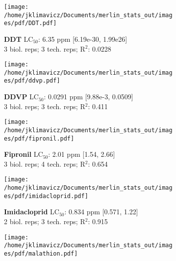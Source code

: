 \documentclass{article}
\begin{document}
\begin{figure}[thp!]
   \begin{subfigure}{0.500\textwidth}
      \centering
      \texttt{[image: /home/jklimavicz/Documents/merlin\_stats\_out/images/pdf/DDT.pdf]}
      \vspace{-0.05cm}
      \caption*{\textbf{DDT} LC$_{50}$: 6.35 ppm [6.19e-30, 1.99e26] \\ 
3 biol. reps; 3 tech. reps; R$^2$: 0.0228}
      \vspace{0.1cm}
   \end{subfigure}%
   \begin{subfigure}{0.500\textwidth}
      \centering
      \texttt{[image: /home/jklimavicz/Documents/merlin\_stats\_out/images/pdf/ddvp.pdf]}
      \vspace{-0.05cm}
      \caption*{\textbf{DDVP} LC$_{50}$: 0.0291 ppm [9.88e-3, 0.0509] \\ 
3 biol. reps; 3 tech. reps; R$^2$: 0.411}
      \vspace{0.1cm}
   \end{subfigure}%
\vspace{-0.1cm}
   \begin{subfigure}{0.500\textwidth}
      \centering
      \texttt{[image: /home/jklimavicz/Documents/merlin\_stats\_out/images/pdf/fipronil.pdf]}
      \vspace{-0.05cm}
      \caption*{\textbf{Fipronil} LC$_{50}$: 2.01 ppm [1.54, 2.66] \\ 
3 biol. reps; 4 tech. reps; R$^2$: 0.654}
      \vspace{0.1cm}
   \end{subfigure}%
   \begin{subfigure}{0.500\textwidth}
      \centering
      \texttt{[image: /home/jklimavicz/Documents/merlin\_stats\_out/images/pdf/imidacloprid.pdf]}
      \vspace{-0.05cm}
      \caption*{\textbf{Imidacloprid} LC$_{50}$: 0.834 ppm [0.571, 1.22] \\ 
2 biol. reps; 3 tech. reps; R$^2$: 0.915}
      \vspace{0.1cm}
   \end{subfigure}%
\vspace{-0.1cm}
   \begin{subfigure}{0.500\textwidth}
      \centering
      \texttt{[image: /home/jklimavicz/Documents/merlin\_stats\_out/images/pdf/malathion.pdf]}
      \vspace{-0.05cm}

\end{subfigure}
\end{figure}
\end{document}

